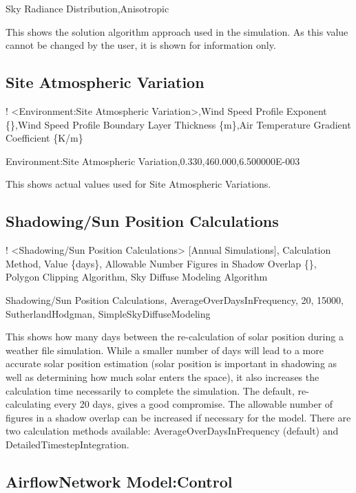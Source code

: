 Sky Radiance Distribution,Anisotropic

This shows the solution algorithm approach used in the simulation. As this value cannot be changed by the user, it is shown for information only.

\subsection{Site Atmospheric Variation}\label{site-atmospheric-variation}

! \textless{}Environment:Site Atmospheric Variation\textgreater{},Wind Speed Profile Exponent \{\},Wind Speed Profile Boundary Layer Thickness \{m\},Air Temperature Gradient Coefficient \{K/m\}

Environment:Site Atmospheric Variation,0.330,460.000,6.500000E-003

This shows actual values used for Site Atmospheric Variations.

\subsection{Shadowing/Sun Position Calculations}\label{shadowingsun-position-calculations}

! \textless{}Shadowing/Sun Position Calculations\textgreater{} {[}Annual Simulations{]}, Calculation Method, Value \{days\}, Allowable Number Figures in Shadow Overlap \{\}, Polygon Clipping Algorithm, Sky Diffuse Modeling Algorithm

Shadowing/Sun Position Calculations, AverageOverDaysInFrequency, 20, 15000, SutherlandHodgman, SimpleSkyDiffuseModeling

This shows how many days between the re-calculation of solar position during a weather file simulation. While a smaller number of days will lead to a more accurate solar position estimation (solar position is important in shadowing as well as determining how much solar enters the space), it also increases the calculation time necessarily to complete the simulation. The default, re-calculating every 20 days, gives a good compromise. The allowable number of figures in a shadow overlap can be increased if necessary for the model. There are two calculation methods available: AverageOverDaysInFrequency (default) and DetailedTimestepIntegration.

\subsection{AirflowNetwork Model:Control}\label{airflownetwork-modelcontrol}

